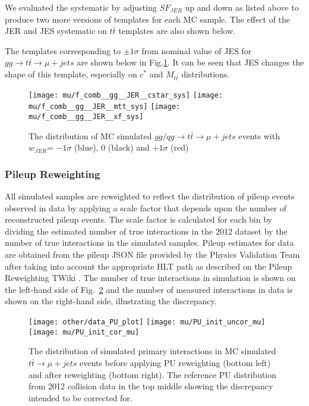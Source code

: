 \documentclass{cmspaperpdf}
\begin{document}
We evaluated the systematic by adjusting $SF_{JER}$ up and down as listed above to produce two more versions of templates for each MC sample. The effect of the JER and JES systematic on $t\bar{t}$ templates are also shown below.

The templates corresponding to $\pm 1\sigma$ from nominal value of JES for $gg\rightarrow t\bar{t}\rightarrow \mu+jets$ are shown below in Fig.\ref{fig:gg_JER_templates}. It can be seen that JES changes the shape of this template, especially on $c^*$ and $M_{t\bar{t}}$ distributions.

\begin{figure}[hbt]
  \begin{center}
    \texttt{[image: mu/f\_comb\_\_gg\_\_JER\_\_cstar\_sys]}
    \texttt{[image: mu/f\_comb\_\_gg\_\_JER\_\_mtt\_sys]}
    \texttt{[image: mu/f\_comb\_\_gg\_\_JER\_\_xf\_sys]}

  \caption{\small The distribution of MC simulated $gg/qg\rightarrow t\bar{t}\rightarrow \mu+jets$ events with $w_{JER}$= $-1\sigma$ (blue), 0 (black) and $+1\sigma$ (red)}
    \label{fig:gg_JER_templates}
  \end{center}
\end{figure}



\subsubsection{Pileup Reweighting}

All simulated samples are reweighted to reflect the distribution of pileup events observed in data by applying a scale factor that depends upon the number of reconstructed pileup events. The scale factor is calculated for each bin by dividing the estimated number of true interactions in the 2012 dataset by the number of true interactions in the simulated samples. Pileup estimates for data are obtained from the pileup JSON file provided by the Physics Validation Team after taking into account the appropriate HLT path as described on the Pileup Reweighting TWiki \cite{pileup_reweighting_twiki}. The number of true interactions in simulation is shown on the left-hand side of Fig.~\ref{fig:MC_and_data_pileup} and the number of measured interactions in data is shown on the right-hand side, illustrating the discrepancy.

\begin{figure}[hbt]
  \begin{center}
    \texttt{[image: other/data\_PU\_plot]}  
    \texttt{[image: mu/PU\_init\_uncor\_mu]}
    \texttt{[image: mu/PU\_init\_cor\_mu]}
  \caption{\small The distribution of simulated primary interactions in MC simulated $t\bar{t}\rightarrow \mu +jets$ events before applying PU reweighting (bottom left) and after reweighting (bottom right). The reference PU distribution from 2012 collision data in the top middle showing the discrepancy intended to be corrected for. }
    \label{fig:MC_and_data_pileup}
  \end{center}
\end{figure}
\end{document}
